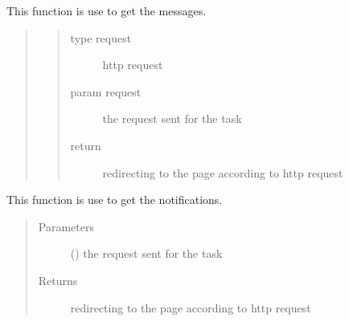 \documentclass[letterpaper,10pt,english]{sphinxmanual}
\begin{document}
\begin{fulllineitems}
\label{\detokenize{janta:janta.views.get_messages}}
This function is use to get the messages.
\begin{quote}
\begin{quote}\begin{description}
\item[{type request}] \leavevmode
http request

\item[{param request}] \leavevmode
the request sent for the task

\item[{return}] \leavevmode
redirecting to the page according to http request

\end{description}\end{quote}
\end{quote}

\end{fulllineitems}


\begin{fulllineitems}
\label{\detokenize{janta:janta.views.get_notifications}}
This function is use to get the notifications.
\begin{quote}\begin{description}
\item[{Parameters}] \leavevmode
{} () \textendash{} the request sent for the task

\item[{Returns}] \leavevmode
redirecting to the page according to http request

\end{description}\end{quote}

\end{fulllineitems}

\end{document}
